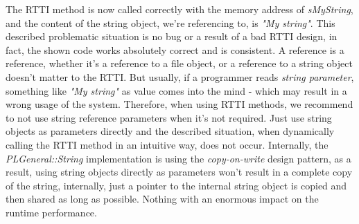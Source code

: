 The RTTI method is now called correctly with the memory address of \emph{sMyString}, and the content of the string object, we're referencing to, is \emph{"My string"}. This described problematic situation is no bug or a result of a bad RTTI design, in fact, the shown code works absolutely correct and is consistent. A reference is a reference, whether it's a reference to a file object, or a reference to a string object doesn't matter to the RTTI. But usually, if a programmer reads \emph{string parameter}, something like \emph{"My string"} as value comes into the mind - which may result in a wrong usage of the system. Therefore, when using RTTI methods, we recommend to not use string reference parameters when it's not required. Just use string objects as parameters directly and the described situation, when dynamically calling the RTTI method in an intuitive way, does not occur. Internally, the \emph{PLGeneral::String} implementation is using the \emph{copy-on-write} design pattern, as a result, using string objects directly as parameters won't result in a complete copy of the string, internally, just a pointer to the internal string object is copied and then shared as long as possible. Nothing with an enormous impact on the runtime performance.
